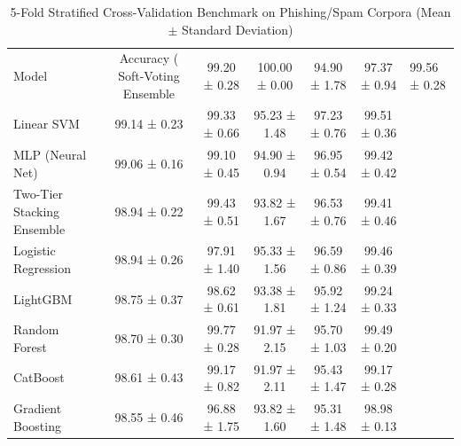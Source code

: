 \begin{table}
\caption{5-Fold Stratified Cross-Validation Benchmark on Phishing/Spam Corpora (Mean $\pm$ Standard Deviation)}
\label{tab:model_cv_benchmark}
\begin{tabular}{lccccc}
\toprule
Model & Accuracy (%
\midrule
Soft-Voting Ensemble & 99.20 ± 0.28 & 100.00 ± 0.00 & 94.90 ± 1.78 & 97.37 ± 0.94 & 99.56 ± 0.28 \\
Linear SVM & 99.14 ± 0.23 & 99.33 ± 0.66 & 95.23 ± 1.48 & 97.23 ± 0.76 & 99.51 ± 0.36 \\
MLP (Neural Net) & 99.06 ± 0.16 & 99.10 ± 0.45 & 94.90 ± 0.94 & 96.95 ± 0.54 & 99.42 ± 0.42 \\
Two-Tier Stacking Ensemble & 98.94 ± 0.22 & 99.43 ± 0.51 & 93.82 ± 1.67 & 96.53 ± 0.76 & 99.41 ± 0.46 \\
Logistic Regression & 98.94 ± 0.26 & 97.91 ± 1.40 & 95.33 ± 1.56 & 96.59 ± 0.86 & 99.46 ± 0.39 \\
LightGBM & 98.75 ± 0.37 & 98.62 ± 0.61 & 93.38 ± 1.81 & 95.92 ± 1.24 & 99.24 ± 0.33 \\
Random Forest & 98.70 ± 0.30 & 99.77 ± 0.28 & 91.97 ± 2.15 & 95.70 ± 1.03 & 99.49 ± 0.20 \\
CatBoost & 98.61 ± 0.43 & 99.17 ± 0.82 & 91.97 ± 2.11 & 95.43 ± 1.47 & 99.17 ± 0.28 \\
Gradient Boosting & 98.55 ± 0.46 & 96.88 ± 1.75 & 93.82 ± 1.60 & 95.31 ± 1.48 & 98.98 ± 0.13 \\
\bottomrule
\end{tabular}
\end{table}
